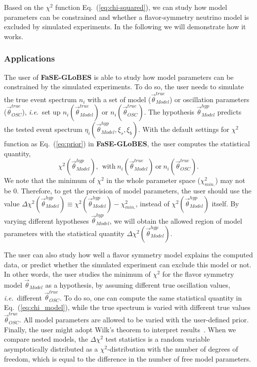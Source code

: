\documentclass[aps,prd,nofootinbib,preprint]{revtex4}
\begin{document}
Based on the $\chi^2$ function Eq.~(\ref{eq:chi-squared}), we can study how model parameters can be constrained and whether a flavor-symmetry neutrino model is excluded by simulated experiments. In the following we will demonstrate how it works.

\subsubsection*{Applications}

The user of \textbf{FaSE-GLoBES} is able to study how model parameters can be constrained by the simulated experiments. To do so, the user needs to simulate the true event spectrum $n_i$ with a set of model ($\vec{\theta}_{Model}^{true}$) or oscillation parameters ($\vec{\theta}_{OSC}^{true}$), \textit{i.e.}~set up $n_i(\vec{\theta}_{Model}^{true})$ or $n_i(\vec{\theta}_{OSC}^{true})$. The hypothesis $\vec{\theta}_{Model}^{hyp}$ predicts the tested event spectrum $\eta_i(\vec{\theta}_{Model}^{hyp},\xi_s,\xi_b)$. With the default settings for $\chi^2$ function as Eq.~(\ref{eq:prior}) in \textbf{FaSE-GLoBES}, the user computes the statistical quantity,
\begin{equation}\label{eq:chi_model}
\chi^2(\vec{\theta}_{Model}^{hyp}),~~\text{with}~n_i(\vec{\theta}_{Model}^{true})~\text{or}~n_i(\vec{\theta}_{OSC}^{true}).
\end{equation}
%
We note that the minimum of $\chi^2$ in the whole parameter space ($\chi^2_{min.}$) may not be $0$. Therefore, to get the precision of model parameters, the user should use the value $\Delta\chi^2(\vec{\theta}_{Model}^{hyp})\equiv \chi^2(\vec{\theta}_{Model}^{hyp})-\chi^2_{min.}$, instead of $\chi^2(\vec{\theta}_{Model}^{hyp})$ itself. By varying different hypotheses $\vec{\theta}_{Model}^{hyp}$, we will obtain the allowed region of model parameters with the statistical quantity $\Delta\chi^2(\vec{\theta}_{Model}^{hyp})$. 

The user can also study how well a flavor symmetry model explains the computed data, or predict whether the simulated experiment can exclude this model or not. In other words, the user studies the minimum of $\chi^2$ for the flavor symmetry model $\vec{\theta}_{Model}$ as a hypothesis, by assuming different true oscillation values, \textit{i.e.}~different $\vec{\theta}^{true}_{OSC}$. To do so, one can compute the same statistical quantity in Eq.~(\ref{eq:chi_model}), while the true spectrum is varied with different true values $\vec{\theta}_{OSC}^{true}$. All model parameters are allowed to be varied with the user-defined prior.
%
Finally, the user might adopt Wilk's theorem to interpret results~\cite{Wilks:1938dza}. When we compare nested models, the $\Delta \chi^2$ test statistics is a random variable asymptotically distributed as a $\chi^2$-distribution with the number of degrees of freedom, which is equal to the difference in the number of free model parameters. 
\end{document}
